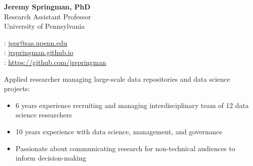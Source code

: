 \documentclass[11pt]{article}
\renewcommand{\today}{\monthname[\the\month] \the\year}
\begin{document}
\thispagestyle{empty}



\begin{multicols}{2}
{\Large {\bf Jeremy Springman, PhD}}\\
Research Assistant Professor\\
University of Pennsylvania\\

\columnbreak
\begin{flushright}

\faEnvelope: \href{mailto:jspr@sas.upenn.edu}{jspr@sas.upenn.edu}\\
\faLaptop: \url{jrspringman.github.io}\\
\faGithub: \url{https://github.com/jrspringman}\\
\end{flushright}
\end{multicols}
\vspace{-10pt}

Applied researcher managing large-scale data repositories and data science projects:
\begin{itemize}[itemsep=0mm, parsep=0pt]
\item 6 years experience recruiting and managing interdisciplinary team of 12 data science researchers
\item 10 years experience with data science, management, and governance
\item Passionate about communicating research for non-technical audiences to inform decision-making
\end{itemize}
\end{document}
